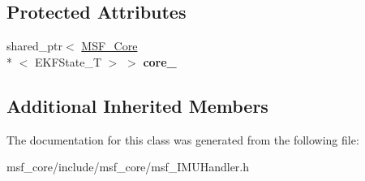 \subsection*{Protected Attributes}
\begin{DoxyCompactItemize}
\item 
\hypertarget{classmsf__core_1_1IMUHandler_ae109422ae1b1ed7833bde860c71a9491}{shared\-\_\-ptr$<$ \hyperlink{classmsf__core_1_1MSF__Core}{M\-S\-F\-\_\-\-Core}\\*
$<$ E\-K\-F\-State\-\_\-\-T $>$ $>$ {\bfseries core\-\_\-}}\label{classmsf__core_1_1IMUHandler_ae109422ae1b1ed7833bde860c71a9491}

\end{DoxyCompactItemize}
\subsection*{Additional Inherited Members}


The documentation for this class was generated from the following file\-:\begin{DoxyCompactItemize}
\item 
msf\-\_\-core/include/msf\-\_\-core/msf\-\_\-\-I\-M\-U\-Handler.\-h\end{DoxyCompactItemize}
